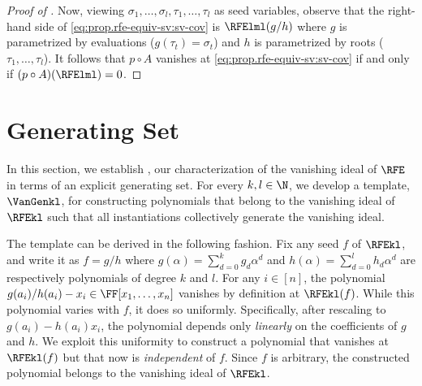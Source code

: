 \begin{proof}[Proof of ]
  Now, viewing \(\sigma_1,\ldots,\sigma_l, \tau_1,\ldots,\tau_l\) as
  seed variables,
  observe that the right-hand side of \eqref{eq:prop.rfe-equiv-sv:sv-cov}
  is \(\RFElml(g/h)\)
  where
  \(g\) is parametrized by evaluations (\(g(\tau_t)=\sigma_t\))
  and
  \(h\) is parametrized by roots (\(\tau_1,\ldots,\tau_l\)).
  It follows that \(p\circ A\) vanishes at
  \eqref{eq:prop.rfe-equiv-sv:sv-cov} if and only if \((p\circ A)(\RFElml)
  = 0\).
\end{proof}

\section{Generating Set}
\label{s.gens}

In this section,
we establish ,
our characterization of the vanishing ideal of $\RFE$ in terms of an explicit
generating set.
For every $k,l \in \N$,
we develop a template, $\VanGenkl$, for constructing polynomials that belong
to the vanishing ideal of $\RFEkl$
such that all instantiations collectively generate the vanishing ideal.

The template can be derived in the following fashion.
Fix any seed \(f\) of \(\RFEkl\),
and write it as \(f = g/h\)
where \(g(\alpha) = \sum_{d=0}^k g_d \alpha^d\) and
\(h(\alpha) = \sum_{d=0}^l h_d \alpha^d\) are respectively polynomials of
degree \(k\) and \(l\).
For any \(i \in [n]\),
the polynomial \(g(a_i)/h(a_i) - x_i \in \FF[x_1,\ldots,x_n]\) vanishes by
definition at \(\RFEkl(f)\).
While this polynomial varies with \(f\),
it does so uniformly.
Specifically,
after rescaling to \(g(a_i) - h(a_i)x_i\),
the polynomial depends only \emph{linearly} on the coefficients of \(g\) and
\(h\).
We exploit this uniformity to construct a polynomial
that vanishes at \(\RFEkl(f)\)
but that now is \emph{independent} of \(f\).
Since \(f\) is arbitrary,
the constructed polynomial belongs to the vanishing ideal of \(\RFEkl\).


